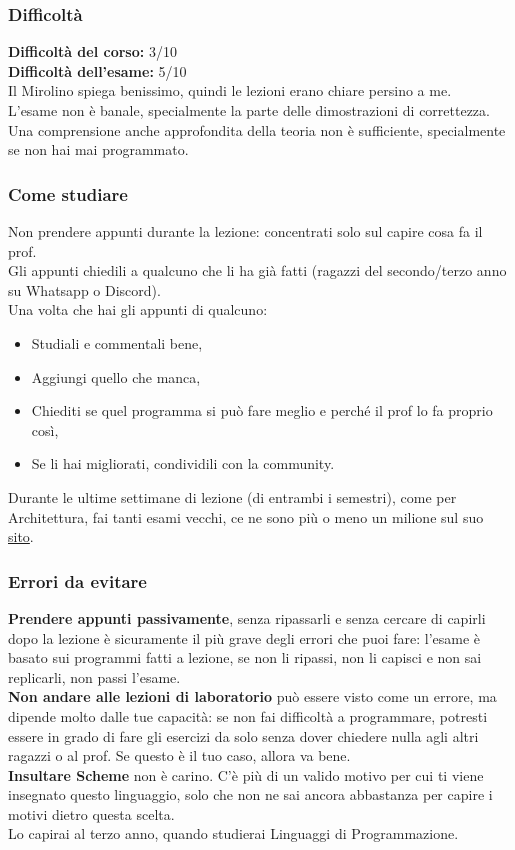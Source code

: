 \documentclass[18pt]{extarticle}
\begin{document}
\subsubsection{Difficoltà}
\textbf{Difficoltà del corso:} 3/10\\
\textbf{Difficoltà dell'esame:} 5/10\\
Il Mirolino spiega benissimo, quindi le lezioni erano chiare persino a me.\\
L'esame non è banale, specialmente la parte delle dimostrazioni di correttezza.\\
Una comprensione anche approfondita della teoria non è sufficiente, specialmente se non hai mai programmato.\\

\subsubsection{Come studiare}
Non prendere appunti durante la lezione: concentrati solo sul capire cosa fa il prof.\\
Gli appunti chiedili a qualcuno che li ha già fatti (ragazzi del secondo/terzo anno su Whatsapp o Discord).\\
Una volta che hai gli appunti di qualcuno:
\begin{itemize}
\item Studiali e commentali bene,
\item Aggiungi quello che manca,
\item Chiediti se quel programma si può fare meglio e perché il prof lo fa proprio così,
\item Se li hai migliorati, condividili con la community.
\end{itemize}
Durante le ultime settimane di lezione (di entrambi i semestri), come per Architettura, fai tanti esami vecchi, ce ne sono più o meno un milione sul suo \href{https://users.dimi.uniud.it/~claudio.mirolo/teaching/programmazione/index.html}{sito}.\\

\subsubsection{Errori da evitare}
\textbf{Prendere appunti passivamente}, senza ripassarli e senza cercare di capirli dopo la lezione è sicuramente il più grave degli errori che puoi fare: l'esame è basato sui programmi fatti a lezione, se non li ripassi, non li capisci e non sai replicarli, non passi l'esame.\\
\textbf{Non andare alle lezioni di laboratorio} può essere visto come un errore, ma dipende molto dalle tue capacità: se non fai difficoltà a programmare, potresti essere in grado di fare gli esercizi da solo senza dover chiedere nulla agli altri ragazzi o al prof. Se questo è il tuo caso, allora va bene.\\
\textbf{Insultare Scheme} non è carino. C'è più di un valido motivo per cui ti viene insegnato questo linguaggio, solo che non ne sai ancora abbastanza per capire i motivi dietro questa scelta.\\
Lo capirai al terzo anno, quando studierai Linguaggi di Programmazione.
\end{document}
